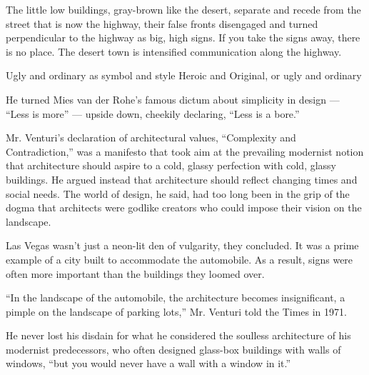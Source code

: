 

    The little low buildings, gray-brown like the desert, separate and recede from the street that is now the highway, their false fronts disengaged and turned perpendicular to the highway as big, high signs.
    If you take the signs away, there is no place.
    The desert town is intensified communication along the highway.\cite{Venturi1972}

    Ugly and ordinary as symbol and style
    Heroic and Original, or ugly and ordinary


    He turned Mies van der Rohe’s famous dictum about simplicity in design — “Less is more” — upside down, cheekily declaring, “Less is a bore.”\cite{Schudel2018}

    Mr. Venturi’s declaration of architectural values, “Complexity and Contradiction,” was a manifesto that took aim at the prevailing modernist notion that architecture should aspire to a cold, glassy perfection with cold, glassy buildings.
    He argued instead that architecture should reflect changing times and social needs.
    The world of design, he said, had too long been in the grip of the dogma that architects were godlike creators who could impose their vision on the landscape.\cite{Schudel2018}

     Las Vegas wasn’t just a neon-lit den of vulgarity, they concluded.
     It was a prime example of a city built to accommodate the automobile.
     As a result, signs were often more important than the buildings they loomed over.\cite{Schudel2018}

    “In the landscape of the automobile, the architecture becomes insignificant, a pimple on the landscape of parking lots,” Mr. Venturi told the Times in 1971.\cite{Schudel2018}

    He never lost his disdain for what he considered the soulless architecture of his modernist predecessors, who often designed glass-box buildings with walls of windows, “but you would never have a wall with a window in it.”\cite{Schudel2018}

